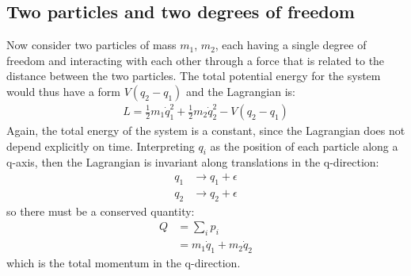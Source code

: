 \subsection{Two particles and two degrees of freedom}
Now consider two particles of mass $m_1$, $m_2$, each having a single degree of freedom and interacting with each other through a force that is related to the distance between the two particles. The total potential energy for the system would thus have a form $V(q_2-q_1)$ and the Lagrangian is:
\begin{align}
L=\frac{1}{2}m_1\dot{q}_1^2+\frac{1}{2}m_2\dot{q}_2^2-V(q_2-q_1)
\end{align}
Again, the total energy of the system is a constant, since the Lagrangian does not depend explicitly on time. Interpreting $q_i$ as the position of each particle along a q-axis, then the Lagrangian is invariant along translations in the q-direction:
\begin{align}
q_1&\to q_1+\epsilon\\
q_2&\to q_2+\epsilon
\end{align}
so there must be a conserved quantity:
\begin{align}
Q&=\sum_ip_i\nonumber\\
&=m_1\dot{q}_1+m_2\dot{q}_2
\end{align}
which is the total momentum in the q-direction.

